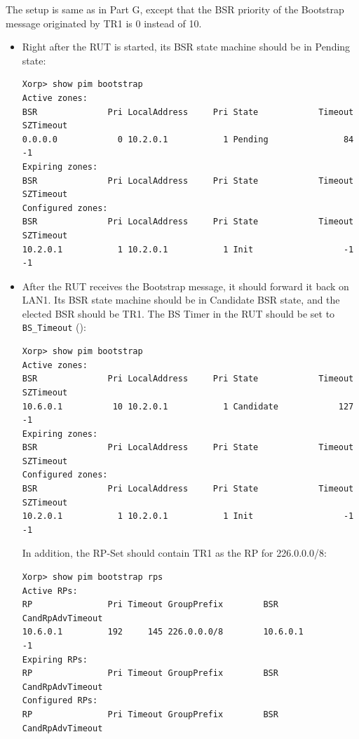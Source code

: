 \documentclass[11pt]{report}
\begin{document}

The setup is same as in Part G, except that the BSR priority of the Bootstrap
message originated by TR1 is 0 instead of 10.



\begin{itemize}

  \item Right after the RUT is started, its BSR state machine should be in
  Pending state:

\begin{verbatim}
Xorp> show pim bootstrap 
Active zones:
BSR              Pri LocalAddress     Pri State            Timeout SZTimeout
0.0.0.0            0 10.2.0.1           1 Pending               84        -1
Expiring zones:
BSR              Pri LocalAddress     Pri State            Timeout SZTimeout
Configured zones:
BSR              Pri LocalAddress     Pri State            Timeout SZTimeout
10.2.0.1           1 10.2.0.1           1 Init                  -1        -1
\end{verbatim}

  \item After the RUT receives the Bootstrap message, it should forward it
        back on LAN1. Its BSR state machine
        should be in Candidate BSR state, and the elected BSR should be TR1.
        The BS Timer in the RUT should be set to \verb=BS_Timeout=
        ({\PimsmBSTimeout}):

\begin{verbatim}
Xorp> show pim bootstrap 
Active zones:
BSR              Pri LocalAddress     Pri State            Timeout SZTimeout
10.6.0.1          10 10.2.0.1           1 Candidate            127        -1
Expiring zones:
BSR              Pri LocalAddress     Pri State            Timeout SZTimeout
Configured zones:
BSR              Pri LocalAddress     Pri State            Timeout SZTimeout
10.2.0.1           1 10.2.0.1           1 Init                  -1        -1
\end{verbatim}

  In addition, the RP-Set should contain TR1 as the RP for 226.0.0.0/8:

\begin{verbatim}
Xorp> show pim bootstrap rps 
Active RPs:
RP               Pri Timeout GroupPrefix        BSR         CandRpAdvTimeout
10.6.0.1         192     145 226.0.0.0/8        10.6.0.1                  -1
Expiring RPs:
RP               Pri Timeout GroupPrefix        BSR         CandRpAdvTimeout
Configured RPs:
RP               Pri Timeout GroupPrefix        BSR         CandRpAdvTimeout
\end{verbatim}

\end{itemize}
\end{document}
